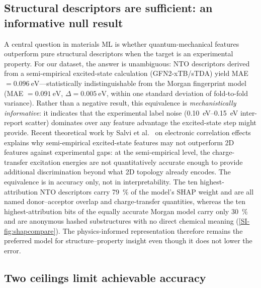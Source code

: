 \subsection{Structural descriptors are sufficient: an informative null result}\label{subsec:nto_null}

A central question in materials ML is whether quantum-mechanical features outperform
pure structural descriptors when the target is an experimental property.
For our dataset, the answer is unambiguous: NTO descriptors derived from a
semi-empirical excited-state calculation (GFN2-xTB/sTDA) yield
MAE $= \qty{0.096}{\electronvolt}$---statistically indistinguishable from the
Morgan fingerprint model (MAE $= \qty{0.091}{\electronvolt}$, $\Delta = \qty{0.005}{\electronvolt}$,
within one standard deviation of fold-to-fold variance).
Rather than a negative result, this equivalence is \emph{mechanistically informative}:
it indicates that the experimental label noise (\qtyrange{0.10}{0.15}{\electronvolt}
inter-report scatter) dominates over any feature advantage the excited-state step might
provide. Recent theoretical work by Salvi et al.~\cite{Salvi2025} on electronic correlation
effects explains why semi-empirical excited-state features may not outperform 2D features
against experimental gaps: at the semi-empirical level, the charge-transfer excitation
energies are not quantitatively accurate enough to provide additional discrimination
beyond what 2D topology already encodes.
The equivalence is in accuracy only, not in interpretability. The ten highest-attribution NTO
descriptors carry \qty{79}{\percent} of the model's SHAP weight and are all named
donor--acceptor overlap and charge-transfer quantities, whereas the ten
highest-attribution bits of the equally accurate Morgan model carry only
\qty{30}{\percent} and are anonymous hashed substructures with no direct chemical
meaning (\cref{SI-fig:shapcompare}). The physics-informed representation therefore remains
the preferred model for structure--property insight even though it does not lower
the error.

\subsection{Two ceilings limit achievable accuracy}\label{subsec:ceilings}

